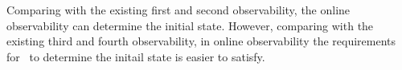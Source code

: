 Comparing with the existing first and second observability, the online observability can determine the initial state. However, comparing with the existing third and fourth observability, in online observability the requirements for \BCNs\ to determine the initail state is easier to satisfy.  %

